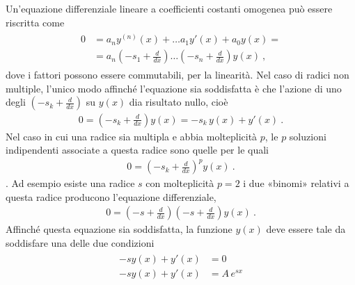 \documentclass[letterpaper,10pt,italian]{jupyterBook}
\begin{document}
\sphinxAtStartPar
Un’equazione differenziale lineare a coefficienti costanti omogenea può essere riscritta come
\begin{equation*}
\begin{split}\begin{aligned}
  0 & = a_n y^{(n)}(x) + \dots a_1 y'(x) + a_0 y(x) = \\
    & = a_n \left( - s_1 + \frac{d}{dx} \right) \dots \left( - s_n + \frac{d}{dx} \right) y(x) \ ,
\end{aligned}\end{split}
\end{equation*}
\sphinxAtStartPar
dove i fattori possono essere commutabili, per la linearità. Nel caso di radici non multiple, l’unico modo affinché l’equazione sia soddisfatta è che l’azione di uno degli  \(\left( - s_k + \frac{d}{dx} \right)\) su \(y(x)\) dia risultato nullo, cioè
\begin{equation*}
\begin{split}0 = \left(  - s_k + \frac{d}{dx} \right) y(x) = - s_k \, y(x) + y'(x) \ .\end{split}
\end{equation*}
\sphinxAtStartPar
Nel caso in cui una radice sia multipla e abbia molteplicità \(p\), le \(p\) soluzioni indipendenti associate a questa radice sono quelle per le quali
\begin{equation*}
\begin{split}0 = \left(  - s_k + \frac{d}{dx} \right)^p y(x) \ .\end{split}
\end{equation*}
\sphinxAtStartPar
{}. Ad esempio esiste una radice \(s\) con molteplicità \(p=2\) i due «binomi» relativi a questa radice producono l’equazione differenziale,
\begin{equation*}
\begin{split}0 = \left( - s + \frac{d}{dx} \right) \left( -s + \frac{d}{dx} \right) y(x) \ .\end{split}
\end{equation*}
\sphinxAtStartPar
Affinché questa equazione sia soddisfatta, la funzione \(y(x)\) deve essere tale da soddisfare una delle due condizioni
\begin{equation*}
\begin{split}\begin{aligned}
  - s y(x) + y'(x) & = 0 \\
  - s y(x) + y'(x) & = A \, e^{s x} \\
\end{aligned}\end{split}
\end{equation*}
\end{document}
